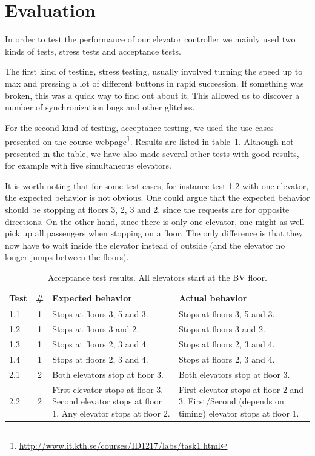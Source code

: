 \documentclass[a4paper]{article}
\begin{document}
\section{Evaluation}

In order to test the performance of our elevator controller we mainly used two
kinds of tests, stress tests and acceptance tests.

The first kind of testing, stress testing, usually involved turning the speed up
to max and pressing a lot of different buttons in rapid succession. If something
was broken, this was a quick way to find out about it. This allowed us to
discover a number of synchronization bugs and other glitches.

For the second kind of testing, acceptance testing, we used the use cases
presented on the course
webpage\footnote{\url{http://www.it.kth.se/courses/ID1217/labs/task1.html}}.
Results are listed in table~\ref{tab:acceptance_test_results}. Although not
presented in the table, we have also made several other tests with good results,
for example with five simultaneous elevators.

It is worth noting that for some test cases, for instance test 1.2 with one
elevator, the expected behavior is not obvious. One could argue that the
expected behavior should be stopping at floors 3, 2, 3 and 2, since the requests
are for opposite directions. On the other hand, since there is only one
elevator, one might as well pick up all passengers when stopping on a floor. The
only difference is that they now have to wait inside the elevator instead of
outside (and the elevator no longer jumps between the floors).

\begin{table}[h]
    \begin{tabular}{| l | c | p{4.7cm} | p{4.7cm} |}
        \hline
        Test & \# & Expected behavior & Actual behavior \\
        \hline
        1.1 & 1 &
            Stops at floors 3, 5 and 3. &
            Stops at floors 3, 5 and 3. \\
        1.2 & 1 &
            Stops at floors 3 and 2. &
            Stops at floors 3 and 2. \\
        1.3 & 1 &
            Stops at floors 2, 3 and 4. &
            Stops at floors 2, 3 and 4. \\
        1.4 & 1 &
            Stops at floors 2, 3 and 4. &
            Stops at floors 2, 3 and 4. \\
        2.1 & 2 &
            Both elevators stop at floor 3. &
            Both elevators stop at floor 3. \\
        2.2 & 2 &
            First elevator stops at floor 3.
                Second elevator stops at floor 1.
                Any elevator stops at floor 2. &
            First elevator stops at floor 2 and 3.
            First/Second (depends on timing) elevator stops at floor 1. \\
        \hline
    \end{tabular}
    \caption{Acceptance test results. All elevators start at the BV floor.}
    \label{tab:acceptance_test_results}
\end{table}
\end{document}
